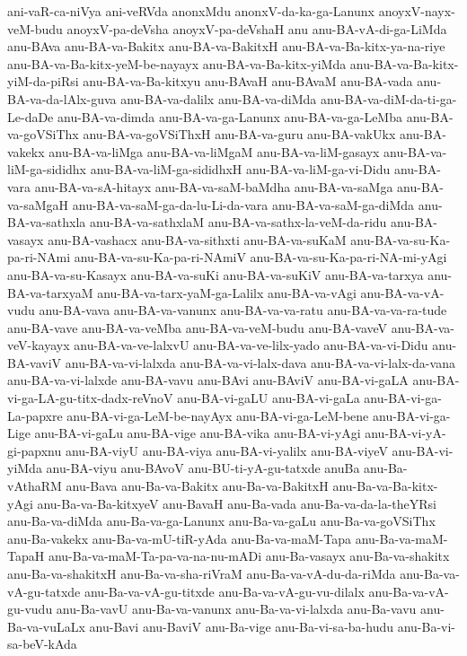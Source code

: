 {ani-vaR-ca-niVya
ani-veRVda
anonxMdu
anonxV-da-ka-ga-Lanunx
anoyxV-nayx-veM-budu
anoyxV-pa-deVsha
anoyxV-pa-deVshaH
anu
anu-BA-vA-di-ga-LiMda
anu-BAva
anu-BA-va-Bakitx
anu-BA-va-BakitxH
anu-BA-va-Ba-kitx-ya-na-riye
anu-BA-va-Ba-kitx-yeM-be-nayayx
anu-BA-va-Ba-kitx-yiMda
anu-BA-va-Ba-kitx-yiM-da-piRsi
anu-BA-va-Ba-kitxyu
anu-BAvaH
anu-BAvaM
anu-BA-vada
anu-BA-va-da-lAlx-guva
anu-BA-va-dalilx
anu-BA-va-diMda
anu-BA-va-diM-da-ti-ga-Le-daDe
anu-BA-va-dimda
anu-BA-va-ga-Lanunx
anu-BA-va-ga-LeMba
anu-BA-va-goVSiThx
anu-BA-va-goVSiThxH
anu-BA-va-guru
anu-BA-vakUkx
anu-BA-vakekx
anu-BA-va-liMga
anu-BA-va-liMgaM
anu-BA-va-liM-gasayx
anu-BA-va-liM-ga-sididhx
anu-BA-va-liM-ga-sididhxH
anu-BA-va-liM-ga-vi-Didu
anu-BA-vara
anu-BA-va-sA-hitayx
anu-BA-va-saM-baMdha
anu-BA-va-saMga
anu-BA-va-saMgaH
anu-BA-va-saM-ga-da-lu-Li-da-vara
anu-BA-va-saM-ga-diMda
anu-BA-va-sathxla
anu-BA-va-sathxlaM
anu-BA-va-sathx-la-veM-da-ridu
anu-BA-vasayx
anu-BA-vashacx
anu-BA-va-sithxti
anu-BA-va-suKaM
anu-BA-va-su-Ka-pa-ri-NAmi
anu-BA-va-su-Ka-pa-ri-NAmiV
anu-BA-va-su-Ka-pa-ri-NA-mi-yAgi
anu-BA-va-su-Kasayx
anu-BA-va-suKi
anu-BA-va-suKiV
anu-BA-va-tarxya
anu-BA-va-tarxyaM
anu-BA-va-tarx-yaM-ga-Lalilx
anu-BA-va-vAgi
anu-BA-va-vA-vudu
anu-BA-vava
anu-BA-va-vanunx
anu-BA-va-va-ratu
anu-BA-va-va-ra-tude
anu-BA-vave
anu-BA-va-veMba
anu-BA-va-veM-budu
anu-BA-vaveV
anu-BA-va-veV-kayayx
anu-BA-va-ve-lalxvU
anu-BA-va-ve-lilx-yado
anu-BA-va-vi-Didu
anu-BA-vaviV
anu-BA-va-vi-lalxda
anu-BA-va-vi-lalx-dava
anu-BA-va-vi-lalx-da-vana
anu-BA-va-vi-lalxde
anu-BA-vavu
anu-BAvi
anu-BAviV
anu-BA-vi-gaLA
anu-BA-vi-ga-LA-gu-titx-dadx-reVnoV
anu-BA-vi-gaLU
anu-BA-vi-gaLa
anu-BA-vi-ga-La-papxre
anu-BA-vi-ga-LeM-be-nayAyx
anu-BA-vi-ga-LeM-bene
anu-BA-vi-ga-Lige
anu-BA-vi-gaLu
anu-BA-vige
anu-BA-vika
anu-BA-vi-yAgi
anu-BA-vi-yA-gi-papxnu
anu-BA-viyU
anu-BA-viya
anu-BA-vi-yalilx
anu-BA-viyeV
anu-BA-vi-yiMda
anu-BA-viyu
anu-BAvoV
anu-BU-ti-yA-gu-tatxde
anuBa
anu-Ba-vAthaRM
anu-Bava
anu-Ba-va-Bakitx
anu-Ba-va-BakitxH
anu-Ba-va-Ba-kitx-yAgi
anu-Ba-va-Ba-kitxyeV
anu-BavaH
anu-Ba-vada
anu-Ba-va-da-la-theYRsi
anu-Ba-va-diMda
anu-Ba-va-ga-Lanunx
anu-Ba-va-gaLu
anu-Ba-va-goVSiThx
anu-Ba-vakekx
anu-Ba-va-mU-tiR-yAda
anu-Ba-va-maM-Tapa
anu-Ba-va-maM-TapaH
anu-Ba-va-maM-Ta-pa-va-na-nu-mADi
anu-Ba-vasayx
anu-Ba-va-shakitx
anu-Ba-va-shakitxH
anu-Ba-va-sha-riVraM
anu-Ba-va-vA-du-da-riMda
anu-Ba-va-vA-gu-tatxde
anu-Ba-va-vA-gu-titxde
anu-Ba-va-vA-gu-vu-dilalx
anu-Ba-va-vA-gu-vudu
anu-Ba-vavU
anu-Ba-va-vanunx
anu-Ba-va-vi-lalxda
anu-Ba-vavu
anu-Ba-va-vuLaLx
anu-Bavi
anu-BaviV
anu-Ba-vige
anu-Ba-vi-sa-ba-hudu
anu-Ba-vi-sa-beV-kAda
}
